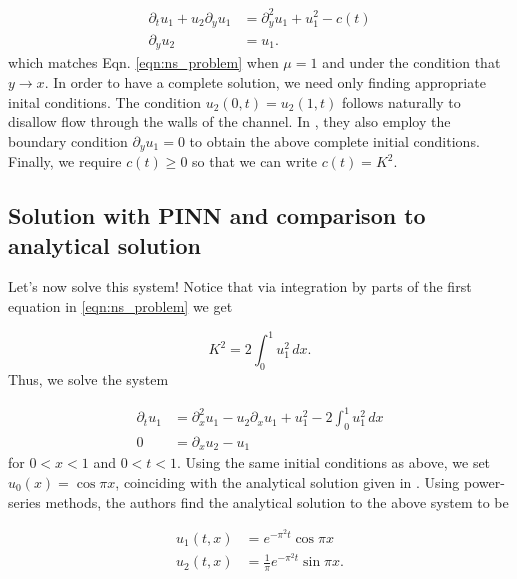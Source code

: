 \documentclass{CUP-JNL-DTM}%
\theoremstyle{definition}
\numberwithin{equation}{section}
\begin{document}
\begin{equation}
    \begin{split}
        \partial_t u_1 + u_2\partial_yu_1 & = \partial_y^2 u_1 + u_1^2 - c(t) \\
        \partial_y u_2 & = u_1. 
    \end{split}
\end{equation}
which matches Eqn. \ref{eqn:ns_problem} when $\mu = 1$ and under the condition that $y \rightarrow x$. In order to have a complete solution, we need only finding appropriate inital conditions. The condition $u_2(0,t) = u_2(1,t)$ follows naturally to disallow flow through the walls of the channel. In \cite{buddBlowupSystemPartial1994}, they also employ the boundary condition $\partial_y u_1 = 0$ to obtain the above complete initial conditions. Finally, we require $c(t) \ge 0$ so that we can write $c(t) = K^2$. 

\subsection{Solution with PINN and comparison to analytical solution}

Let's now solve this system! Notice that via integration by parts of the first equation in \ref{eqn:ns_problem} we get

\begin{equation}
    K^2 = 2\int_0^1 u_1^2 \, dx. 
\end{equation}
Thus, we solve the system

\begin{equation}
    \begin{split}
        \partial_t u_1 & = \partial_x^2 u_1 - u_2 \partial_x u_1 + u_1^2 - 2\int_0^1 u_1^2 \,dx \\
        0 & = \partial_x u_2 - u_1
    \end{split}
\end{equation}
for $0 < x < 1$ and $0 < t < 1$. Using the same initial conditions as above, we set $u_0(x) = \cos \pi x$, coinciding with the analytical solution given in \cite{benhammoudaAnalyticalSolutionsSystems2014}. Using power-series methods, the authors find the analytical solution to the above system to be

\begin{equation}
    \begin{split}
        u_1(t,x) & = e^{-\pi^2t}\cos \pi x \\
        u_2(t,x) & = \frac{1}{\pi}e^{-\pi^2t} \sin \pi x. 
    \end{split}
\end{equation}
\end{document}
